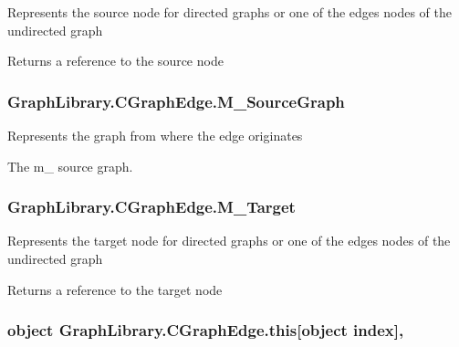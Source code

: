 Represents the source node for directed graphs or one of the edge\textquotesingle{}s nodes of the undirected graph 

Returns a reference to the source node \hypertarget{class_graph_library_1_1_c_graph_edge_aa1b8faca82c1d9fe1cafef980a1cbb82}{}
\subsubsection[{M\+\_\+\+Source\+Graph}]{ Graph\+Library.\+C\+Graph\+Edge.\+M\+\_\+\+Source\+Graph\hspace{0.3cm}{\ttfamily [get]}}\label{class_graph_library_1_1_c_graph_edge_aa1b8faca82c1d9fe1cafef980a1cbb82}


Represents the graph from where the edge originates 

The m\+\_\+ source graph. \hypertarget{class_graph_library_1_1_c_graph_edge_a42c115e4937a251f524edc71a2b1ea7a}{}
\subsubsection[{M\+\_\+\+Target}]{ Graph\+Library.\+C\+Graph\+Edge.\+M\+\_\+\+Target\hspace{0.3cm}{\ttfamily [get]}}\label{class_graph_library_1_1_c_graph_edge_a42c115e4937a251f524edc71a2b1ea7a}


Represents the target node for directed graphs or one of the edge\textquotesingle{}s nodes of the undirected graph 

Returns a reference to the target node \hypertarget{class_graph_library_1_1_c_graph_edge_ad5cb4b4ef0423da4a0c2b156cf3fb3f7}{}
\subsubsection[{this[object index]}]{\setlength{\rightskip}{0pt plus 5cm}object Graph\+Library.\+C\+Graph\+Edge.\+this\mbox{[}object index\mbox{]}\hspace{0.3cm}{\ttfamily [get]}, {\ttfamily [set]}}\label{class_graph_library_1_1_c_graph_edge_ad5cb4b4ef0423da4a0c2b156cf3fb3f7}


